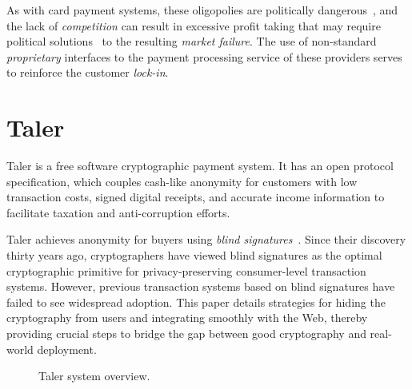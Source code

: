 \documentclass{llncs}
\begin{document}
As with card payment systems, these oligopolies are politically
dangerous~\cite{crinkey2011rundle}, and the lack of {\em competition}
can result in excessive profit taking that may require political
solutions~\cite{guardian2015cap} to the resulting {\em market
  failure}.  The use of non-standard {\em proprietary} interfaces to
the payment processing service of these providers serves to reinforce
the customer {\em lock-in}.


\section{Taler}

Taler is a free software cryptographic payment system. It has an open
protocol specification, which couples cash-like anonymity for customers
with low transaction costs, signed digital
receipts, and accurate income information to facilitate taxation and
anti-corruption efforts.

Taler achieves anonymity for buyers using {\em blind
signatures}~\cite{chaum1983blind}.  Since their discovery thirty years
ago, cryptographers have viewed blind signatures as the optimal
cryptographic primitive for privacy-preserving consumer-level transaction systems.
However, previous transaction systems based on blind signatures have
failed to see widespread adoption.  This paper details strategies for
hiding the cryptography from users and integrating smoothly with the
Web, thereby providing crucial steps to bridge the gap between good
cryptography and real-world deployment.


\begin{figure}[b!]
\centering
{}
\caption{Taler system overview.}
\label{fig:system}
\end{figure}
\end{document}
